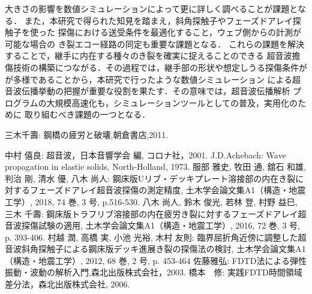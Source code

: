 ﻿\documentclass[11pt,a4j]{mybook2}
\begin{document}
大きさの影響を数値シミュレーションによって更に詳しく調べることが課題となる．
また，本研究で得られた知見を踏まえ，斜角探触子やフェーズドアレイ探触子を使った
探傷における送受条件を最適化すること，ウェブ側からの計測が可能な場合の
き裂エコー経路の同定も重要な課題となる．
これらの課題を解決することで，継手に内在する種々のき裂を確実に捉えることのできる
超音波擔傷技術の構築につながる．その過程では，継手部の形状や想定しうる探傷条件が
が多様であることから，本研究で行ったような数値シミュレーション
による超音波伝播挙動の把握が重要な役割を果たす．その意味では，超音波伝播解析
プログラムの大規模高速化も，シミュレーションツールとしての普及，実用化のために
取り組むべき課題の一つとなる．
\renewcommand{\bibname}{参考文献}
\begin{thebibliography}{99}
	三木千壽: 鋼橋の疲労と破壊,朝倉書店,2011.

	中村 僖良: 超音波，日本音響学会 編, コロナ社，2001. 
	J.D.Achebach: Wave propagation in elastic solids, North-Holland, 1973.
	服部 雅史, 牧田 通, 舘石 和雄, 判治 剛, 清水 優, 八木 尚人:
	鋼床版Uリブ・デッキプレート溶接部の内在き裂に対するフェーズドアレイ超音波探傷の測定精度, 
	土木学会論文集A1（構造・地震工学）, 2018, 74 巻, 3 号, p.516-530.
	八木 尚人, 鈴木 俊光, 若林 登, 村野 益巳, 三木 千壽: 
	鋼床版トラフリブ溶接部の内在疲労き裂に対するフェーズドアレイ超音波探傷試験の適用,
	土木学会論文集A1（構造・地震工学）, 2016, 72 巻, 3 号, p. 393-406.
	村越 潤, 高橋 実, 小池 光裕, 木村 友則: 臨界屈折角近傍に調整した超音波斜角探触子による鋼床版デッキ進展き裂の探傷法の検討, 
	土木学会論文集A1（構造・地震工学）, 2012, 68 巻, 2 号, p. 453-464
	佐藤雅弘: FDTD法による弾性振動・波動の解析入門,森北出版株式会社，2003.
	橋本　修: 実践FDTD時間領域差分法，森北出版株式会社, 2006.
\end{thebibliography}
\end{document}
